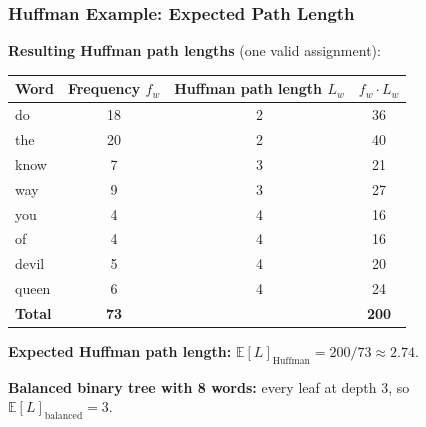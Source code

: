 \documentclass[notes,11pt, aspectratio=169]{beamer}
\begin{document}
\begin{frame}
\frametitle{Huffman Example: Expected Path Length}

\textbf{Resulting Huffman path lengths} (one valid assignment):
\vspace{4pt}
\begin{center}
\renewcommand{\arraystretch}{1.2}
\small
\begin{tabular}{l c c c}
\toprule
\textbf{Word} & \textbf{Frequency $f_w$} & \textbf{Huffman path length $L_w$} & \textbf{$f_w \cdot L_w$} \\
\midrule
do & 18 & 2 & 36 \\
the & 20 & 2 & 40 \\
know & 7 & 3 & 21 \\
way & 9 & 3 & 27 \\
you & 4 & 4 & 16 \\
of & 4 & 4 & 16 \\
devil & 5 & 4 & 20 \\
queen & 6 & 4 & 24 \\
\midrule
\textbf{Total} & \textbf{73} & & \textbf{200} \\
\bottomrule
\end{tabular}
\end{center}

\vspace{6pt}
\textbf{Expected Huffman path length:} $\mathbb{E}[L]_\text{Huffman} = 200 / 73 \approx 2.74$.

\vspace{4pt}
\textbf{Balanced binary tree with 8 words:} every leaf at depth 3, so $\mathbb{E}[L]_\text{balanced} = 3$.

\vspace{6pt}
\end{frame}
\end{document}
